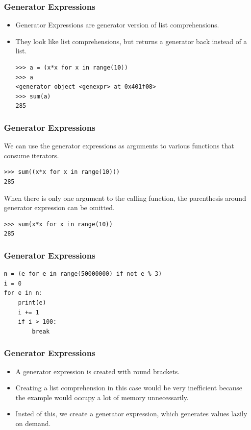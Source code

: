 \begin{frame}[fragile]\frametitle{Generator Expressions}

    \begin{itemize}
    \item  Generator Expressions are generator version of list comprehensions. 
    \item They look like list comprehensions, but returns a generator back instead of a list.
\begin{lstlisting}
>>> a = (x*x for x in range(10))
>>> a
<generator object <genexpr> at 0x401f08>
>>> sum(a)
285
\end{lstlisting}
    \end{itemize}
\end{frame}

\begin{frame}[fragile]\frametitle{Generator Expressions}
We can use the generator expressions as arguments to various functions that consume iterators.
\begin{lstlisting}
>>> sum((x*x for x in range(10)))
285
\end{lstlisting}
When there is only one argument to the calling function, the parenthesis around generator expression can be omitted.
\begin{lstlisting}
>>> sum(x*x for x in range(10))
285
\end{lstlisting}
\end{frame}

\begin{frame}[fragile]\frametitle{Generator Expressions}
\begin{lstlisting}
n = (e for e in range(50000000) if not e % 3)
i = 0
for e in n:
    print(e)
    i += 1
    if i > 100:
        break
\end{lstlisting}
\end{frame}


\begin{frame}[fragile]\frametitle{Generator Expressions}

    \begin{itemize}
    \item  A generator expression is created with round brackets. 
    \item Creating a list comprehension in this case would be very inefficient because the example would occupy a lot of memory unnecessarily.
    \item Insted of this, we create a generator expression, which generates values lazily on demand. 
    \end{itemize}
\end{frame}



